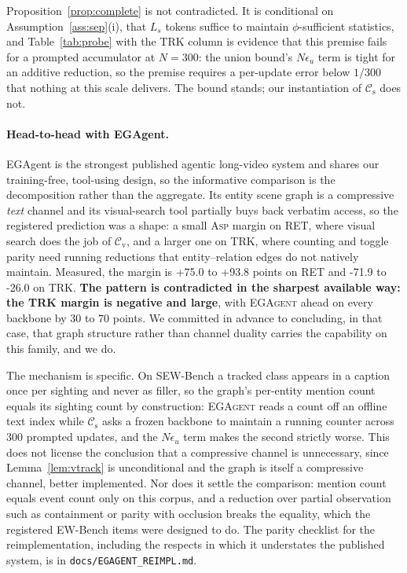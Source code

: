 \documentclass[10pt]{article}
\newcommand{\VN}{300}
\newcommand{\VegaRETMin}{+75.0}
\newcommand{\VegaRETMax}{+93.8}
\newcommand{\VegaTRKMin}{-71.9}
\newcommand{\VegaTRKMax}{-26.0}
\theoremstyle{definition}
\theoremstyle{plain}
\newcommand{\ASP}{\textsc{Asp}}
\newcommand{\cs}{\mathcal{C}_{\mathrm{s}}}
\newcommand{\cv}{\mathcal{C}_{\mathrm{v}}}
\begin{document}
Proposition~\ref{prop:complete} is not contradicted. It is conditional on
Assumption~\ref{ass:sep}(i), that $L_s$ tokens suffice to maintain $\phi$-sufficient
statistics, and Table~\ref{tab:probe} with the TRK column is evidence that this premise fails
for a prompted accumulator at $N{=}\VN{}$: the union bound's $N\epsilon_u$ term is tight for an
additive reduction, so the premise requires a per-update error below $1/\VN{}$ that nothing at
this scale delivers. The bound stands; our instantiation of $\cs$ does not.

\paragraph{Head-to-head with EGAgent.} EGAgent \citep{egagent} is the strongest published
agentic long-video system and shares our training-free, tool-using design, so the informative
comparison is the decomposition rather than the aggregate. Its entity scene graph is a
compressive \emph{text} channel and its visual-search tool partially buys back verbatim access,
so the registered prediction was a shape: a small \ASP{} margin on RET, where visual search does
the job of $\cv$, and a larger one on TRK, where counting and toggle parity need running
reductions that entity--relation edges do not natively maintain. Measured, the margin is
\VegaRETMin{} to \VegaRETMax{} points on RET and \VegaTRKMin{} to \VegaTRKMax{} on TRK.
\textbf{The pattern is contradicted in the sharpest available way: the TRK margin is negative
and large}, with \textsc{EGAgent} ahead on every backbone by $30$ to $70$ points. We committed
in advance to concluding, in that case, that graph structure rather than channel duality carries
the capability on this family, and we do.

The mechanism is specific. On SEW-Bench a tracked class appears in a caption once per sighting
and never as filler, so the graph's per-entity mention count equals its sighting count by
construction: \textsc{EGAgent} reads a count off an offline text index while $\cs$ asks a frozen
backbone to maintain a running counter across $\VN{}$ prompted updates, and the $N\epsilon_u$
term makes the second strictly worse. This does not license the conclusion that a compressive
channel is unnecessary, since Lemma~\ref{lem:vtrack} is unconditional and the graph is itself a
compressive channel, better implemented. Nor does it settle the comparison: mention count equals
event count only on this corpus, and a reduction over partial observation such as containment or
parity with occlusion breaks the equality, which the registered EW-Bench items were designed to
do. The parity checklist for the reimplementation, including the respects in which it
understates the published system, is in \texttt{docs/EGAGENT\_REIMPL.md}.
\end{document}
